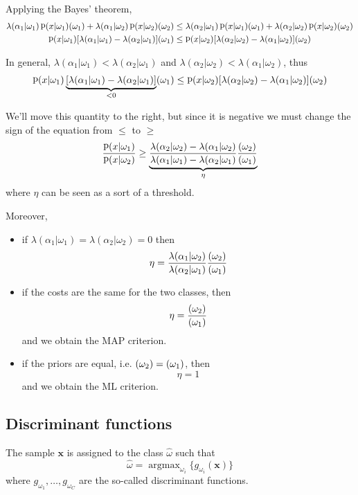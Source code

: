 \documentclass[oneside,onecolumn]{report}
\DeclareMathOperator*{\argmax}{argmax}
\DeclareMathOperator*{\pdf}{p}
\let\P\relax
\DeclareMathOperator*{\P}{P}
\begin{document}
Applying the Bayes' theorem,
\begin{gather*}
        \lambda(\alpha_1 | \omega_1) \pdf(x | \omega_1) \P(\omega_1) + \lambda(\alpha_1 | \omega_2) \pdf(x | \omega_2) \P(\omega_2) \leq \lambda(\alpha_2 | \omega_1) \pdf(x | \omega_1) \P(\omega_1) + \lambda(\alpha_2 | \omega_2) \pdf(x | \omega_2) \P(\omega_2) \\
        \pdf(x | \omega_1) [\lambda(\alpha_1 | \omega_1) - \lambda(\alpha_2 | \omega_1)] \P(\omega_1) \leq \pdf(x | \omega_2) [\lambda(\alpha_2 | \omega_2) - \lambda(\alpha_1 | \omega_2)] \P(\omega_2)
\end{gather*}

In general, $\lambda(\alpha_1|\omega_1) < \lambda(\alpha_2|\omega_1)$ and $\lambda(\alpha_2|\omega_2) < \lambda(\alpha_1|\omega_2)$, thus
$$  \pdf(x | \omega_1) \underbrace{[\lambda(\alpha_1 | \omega_1) - \lambda(\alpha_2 | \omega_1)]}_{< 0} \P(\omega_1) \leq \pdf(x | \omega_2) [\lambda(\alpha_2 | \omega_2) - \lambda(\alpha_1 | \omega_2)] \P(\omega_2) $$

We'll move this quantity to the right, but since it is negative we must change the sign of the equation from $\leq$ to $\geq$
$$ \frac{\pdf(x | \omega_1)}{\pdf(x | \omega_2)} \geq \underbrace{\frac{\lambda(\alpha_2 | \omega_2) - \lambda(\alpha_1 | \omega_2)}{\lambda(\alpha_1 | \omega_1) - \lambda(\alpha_2 | \omega_1)} \frac{\P(\omega_2)}{\P(\omega_1)}}_\eta $$
where $\eta$ can be seen as a sort of a threshold.

Moreover,
\begin{itemize}
    \item if $\lambda(\alpha_1|\omega_1) = \lambda(\alpha_2|\omega_2) = 0$ then
    $$ \eta = \frac{\lambda(\alpha_1 | \omega_2)}{\lambda(\alpha_2 | \omega_1)} \frac{\P(\omega_2)}{\P(\omega_1)} $$

    \item if the costs are the same for the two classes, then
    $$ \eta = \frac{\P(\omega_2)}{\P(\omega_1)} $$
    and we obtain the MAP criterion.

    \item if the priors are equal, i.e. $\P(\omega_2) = \P(\omega_1)$, then
    $$ \eta = 1 $$
    and we obtain the ML criterion.
\end{itemize}


\subsection{Discriminant functions}
The sample $\bm x$ is assigned to the class $\widehat \omega$ such that
$$ \widehat \omega = \argmax_{\omega_i} \{ g_{\omega_i}(\bm x) \} $$
where $g_{\omega_1}, \dots, g_{\omega_C}$ are the so-called discriminant functions.
\end{document}
